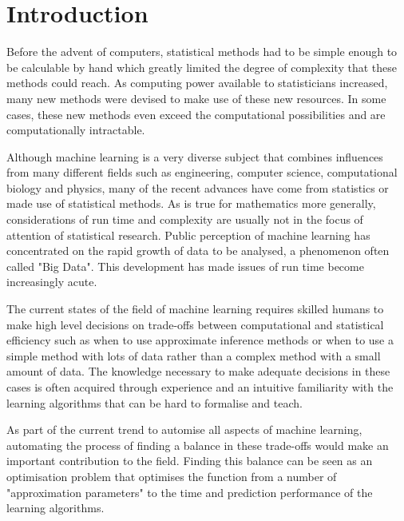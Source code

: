 \documentclass[a4paper,12pt,twoside,openright]{report}
\begin{document}
\pagestyle{empty}
\singlespacing

\onehalfspacing

\singlespacing


\setcounter{page}{0}
\pagestyle{plain}
\tableofcontents
\listoffigures
\listoftables

\onehalfspacing


\chapter{Introduction}

\setcounter{page}{1}
Before the advent of computers, statistical methods had to be simple enough to be calculable by hand which greatly limited the degree of complexity that these methods could reach. As computing power available to statisticians increased, many new methods were devised to make use of these new resources. In some cases, these new methods even exceed the computational possibilities and are computationally intractable. 

Although machine learning is a very diverse subject that combines influences from many different fields such as engineering, computer science, computational biology and physics, many of the recent advances have come from statistics or made use of statistical methods. As is true for mathematics more generally, considerations of run time and complexity are usually not in the focus of attention of statistical research. Public perception of machine learning has concentrated on the rapid growth of data to be analysed, a phenomenon often called "Big Data". This development has made issues of run time become increasingly acute. 

The current states of the field of machine learning requires skilled humans to make high level decisions on trade-offs between computational and statistical efficiency such as when to use approximate inference methods or when to use a simple method with lots of data rather than a complex method with a small amount of data. The knowledge necessary to make adequate decisions in these cases is often acquired through experience and an intuitive familiarity with the learning algorithms that can be hard to formalise and teach.

As part of the current trend to automise all aspects of machine learning, automating the process of finding a balance in these trade-offs would make an important contribution to the field. Finding this balance can be seen as an optimisation problem that optimises the function from a number of "approximation parameters" to the time and prediction performance of the learning algorithms. 
\end{document}
